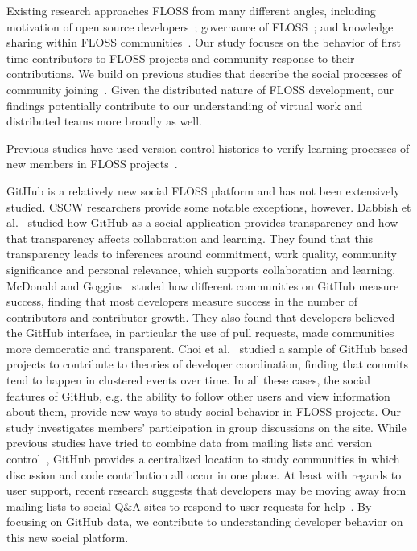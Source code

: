 \documentclass{sigchi}
\begin{document}
Existing research approaches FLOSS from many different angles, including
motivation of open source
developers~\cite{fang_understanding_2009, lakhani_why_2003, shah_motivation_2006}; governance of FLOSS~\cite{hippel_open_2003, omahony_guarding_2003, 
omahony_governance_2007};
and knowledge sharing within FLOSS
communities~\cite{endres_tacit_2007, hemetsberger_collective_2009, sowe_understanding_2008}.
Our study focuses on the behavior of first time contributors to FLOSS projects
and community response to their contributions. We build on previous studies that
describe the social processes of community
joining~\cite{ducheneaut_socialization_2005, huang_mining_2005, von_krogh_community_2003}. Given the
distributed nature of FLOSS development, our findings potentially contribute to our understanding of virtual work and distributed teams more broadly as well.

Previous studies have used version control histories to verify learning
processes of new members in FLOSS projects~\cite{huang_mining_2005}. 

GitHub is a relatively new social FLOSS platform and has not been extensively studied. CSCW researchers provide some notable exceptions, however.
Dabbish et al.~\cite{dabbish_social_2012} studied how GitHub as a
social application provides transparency and how that transparency affects
collaboration and learning. They found that this transparency leads to
inferences around commitment, work quality, community significance and personal
relevance, which supports collaboration and learning. McDonald and
Goggins~\cite{mcdonald_performance_2013} studed how different communities on
GitHub measure success, finding that most developers measure success in the
number of contributors and contributor growth. They also found that developers
believed the GitHub interface, in particular the use of pull requests, made
communities more democratic and transparent. Choi et
al.~\cite{choi_herding_2013} studied a sample of GitHub based projects to
contribute to theories of developer coordination, finding that commits tend to
happen in clustered events over time. In all these cases, the social features of
GitHub, e.g. the ability to follow other users and view information about them,
provide new ways to study social behavior in FLOSS projects. Our study
investigates members' participation in group discussions on the site. While
previous studies have tried to combine data from mailing lists and version
control~\cite{ducheneaut_socialization_2005}, GitHub provides a centralized
location to study communities in which discussion and code contribution all
occur in one place. At least with regards to user support, recent research
suggests that developers may be moving away from mailing lists to social Q\&A
sites to respond to user requests for help~\cite{vasilescu_how_2014}. By
focusing on GitHub data, we contribute to understanding developer behavior on
this new social platform.
\end{document}
